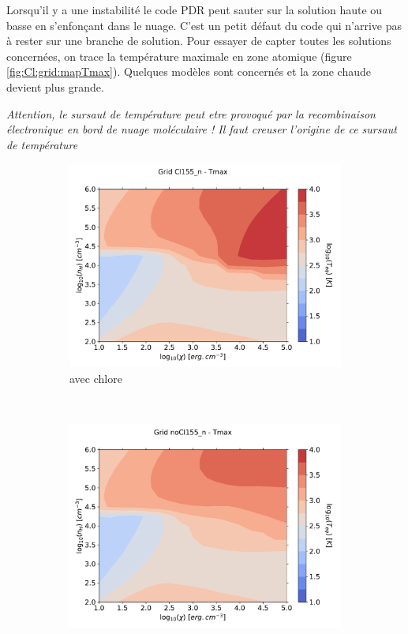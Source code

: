 Lorsqu'il y a une instabilité le code PDR peut sauter sur la solution haute ou basse en s'enfonçant dans le nuage. C'est un petit défaut du code qui n'arrive pas à rester sur une branche de solution. Pour essayer de capter toutes les solutions concernées, on trace la température maximale en zone atomique (figure \ref{fig:Cl:grid:mapTmax}). Quelques modèles sont concernés et la zone chaude devient plus grande.

\textit{Attention, le sursaut de température peut etre provoqué par la recombinaison électronique en bord de nuage moléculaire ! Il faut creuser l'origine de ce sursaut de température}

\begin{figure}[!htbp]
    \centering
    \begin{subfigure}[t]{0.45\textwidth} %
        \centering \includegraphics[trim = {0 0 0 1.5cm},clip,width=1\textwidth]{figure/Cl/grid/mapTmax.pdf}
        \caption{avec chlore}
    \end{subfigure}
    ~ 
    \begin{subfigure}[t]{0.45\textwidth}
        \centering \includegraphics[trim = {0 0 0 1.5cm},clip,width=1\textwidth]{figure/Cl/grid/nomapTmax.pdf}

\end{subfigure}
\end{figure}
